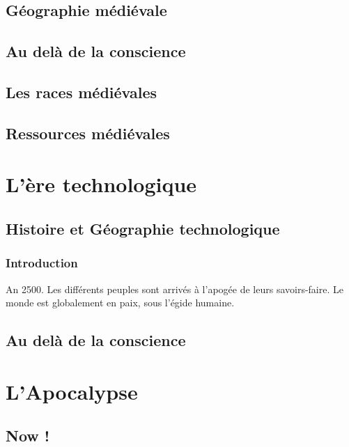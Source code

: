 \documentclass{book}
\makeatletter
\newcommand{\partimage}[2][]{\gdef\@partimage{\texttt{[image: \#2]}}}
\makeatother
\begin{document}
\chapter{Géographie médiévale}

 

\chapter{Au delà de la conscience}




\chapter{Les races médiévales}


\chapter{Ressources médiévales}


\partimage[scale=0.2]{./Ressources/techno/engrenages.jpg}
\part{L'ère technologique}
\chapter{Histoire et Géographie technologique}
\section{Introduction}
An 2500. Les différents peuples sont arrivés à l'apogée de leurs savoirs-faire. Le monde est globalement en paix, sous l'égide humaine.

\chapter{Au delà de la conscience}


\partimage[scale=0.25]{./Ressources/apoca/soldats.jpg}
\part{L'Apocalypse}
\chapter{Now !}
\end{document}

